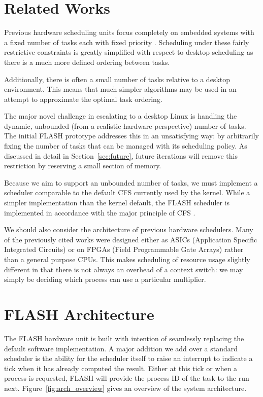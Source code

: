 \documentclass{sig-alternate-10pt}
\begin{document}
\section{Related Works}
\label{sec:related_works}
Previous hardware scheduling units focus completely on embedded systems with
a fixed number of tasks each with fixed priority
\cite{kuacharoen2003configurable, morton2004hardware, nacul2007hardware, nakano1995hardware,
park2008hardware}.  Scheduling under these fairly restrictive constraints is
greatly simplified with respect to desktop scheduling as there is a much
more defined ordering between tasks.

Additionally, there is often a small number of tasks relative to a desktop
environment.  This means that much simpler algorithms may be used in an
attempt to approximate the optimal task ordering.

The major novel challenge in escalating to a desktop Linux is handling the
dynamic, unbounded (from a realistic hardware perspective) number of tasks.
The initial FLASH prototype addresses this in an unsatisfying way: by
arbitrarily fixing the number of tasks that can be managed with its
scheduling policy.  As discussed in detail in Section~\ref{sec:future},
future iterations will remove this restriction by reserving a small section
of memory.

Because we aim to support an unbounded number of tasks, we must implement
a scheduler comparable to the default CFS currently used by the kernel.
While a simpler implementation than the kernel default, the FLASH scheduler
is implemented in accordance with the major principle of CFS
\cite{wong2008cfs}.

We should also consider the architecture of previous hardware schedulers.
Many of the previously cited works were designed either as ASICs
(Application Specific Integrated Circuits) or on FPGAs (Field Programmable
Gate Arrays) rather than a general purpose CPUs.  This makes scheduling of
resource usage slightly different in that there is not always an overhead of
a context switch: we may simply be deciding which process can use
a particular multiplier.


\section{FLASH Architecture}
\label{sec:arch}
The FLASH hardware unit is built with intention of seamlessly replacing the default software implementation. A major addition we add over a standard
scheduler is the ability for the scheduler itself to raise an
interrupt to indicate a tick when it has already computed the result. Either at this tick or when a process is
requested, FLASH will provide the process ID of the task to the run next.
Figure~\ref{fig:arch_overview} gives an overview of the system architecture.
\end{document}

